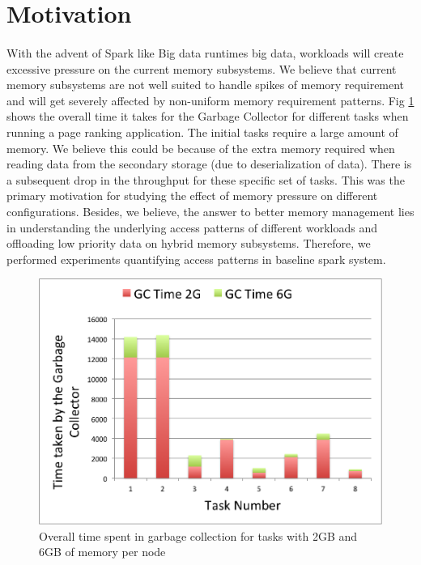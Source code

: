 \section{Motivation} 
\label{sec:motivation}
\paragraph{}
With the advent of Spark like Big data runtimes big data, workloads will create excessive pressure on the current memory subsystems. We believe that current memory subsystems are not well suited to handle spikes of memory requirement and will get severely affected by non-uniform memory requirement patterns. Fig \ref{fig:fig1} shows the overall time it takes for the Garbage Collector for different tasks when running a page ranking application. The initial tasks require a large amount of memory. We believe this could be because of the extra memory required when reading data from the secondary storage (due to deserialization of data). There is a subsequent drop in the throughput for these specific set of tasks. This was the primary motivation for studying the effect of memory pressure on different configurations. Besides, we believe, the answer to better memory management lies in understanding the underlying access patterns of different workloads and offloading low priority data on hybrid memory subsystems. Therefore, we performed experiments quantifying access patterns in baseline spark system.

\begin{figure}[!ht]
\caption{Overall time spent in garbage collection for tasks with 2GB and 6GB of memory per node}
\label{fig:fig1}
\includegraphics[scale=0.50]{./images/image1.png}
\end{figure}

